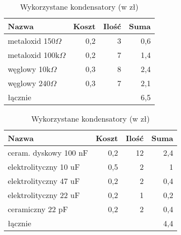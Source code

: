 \begin{table}[!htbp]
\centering
\caption{Wykorzystane rezystory (w zł)}
\begin{tabular}{l|r|r|r}
Nazwa          & Koszt & Ilość & Suma \\
\hline
metaloxid 150$\Omega$  & 0,2 & 3 & 0,6 \\
metaloxid 100k$\Omega$  & 0,2 & 7 & 1,4 \\
węglowy 10k$\Omega$     & 0,3 & 8 & 2,4 \\
węglowy 240$\Omega$     & 0,3 & 7 & 2,1 \\
\hline
łącznie           &     &   & 6,5
\end{tabular}

\caption{Wykorzystane kondensatory (w zł)}
\begin{tabular}{l|r|r|r}
Nazwa          & Koszt & Ilość & Suma \\
\hline
ceram. dyskowy 100 nF & 0,2 & 12 & 2,4 \\
elektrolityczny 10 uF & 0,5 & 2  & 1   \\
elektrolityczny 47 uF & 0,2 & 2  & 0,4 \\
elektrolityczny 22 uF & 0,2 & 1  & 0,2 \\
ceramiczny 22 pF      & 0,2 & 2  & 0,4 \\
\hline
łącznie                &     & & 4,4
\end{tabular}
\end{table}
